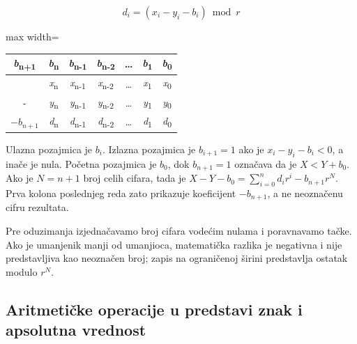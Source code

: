 \documentclass[a4paper,11pt]{article}
\numberwithin{equation}{section}
\newcommand{\redlinija}{\arrayrulecolor{black!28}\specialrule{0.3pt}{2pt}{2pt}\arrayrulecolor{black}}
\begin{document}
\begin{equation}\label{eq:1.2.1}
d_{i} = \left( x_i-y_i-b_i \right)\bmod r
\end{equation}


\begin{center}\begin{adjustbox}{max width=\linewidth}
\begin{tabular}{ccccccc}\toprule
\emph{b}\textsubscript{n+1} & \emph{b}\textsubscript{n} & \emph{b}\textsubscript{n-1} & \emph{b}\textsubscript{n-2} & \ldots{} & \emph{b}\textsubscript{1} & \emph{b}\textsubscript{0} \\
\midrule
 & \emph{x}\textsubscript{n} & \emph{x}\textsubscript{n-1} & \emph{x}\textsubscript{n-2} & \ldots{} & \emph{x}\textsubscript{1} & \emph{x}\textsubscript{0} \\
\redlinija
- & \emph{y}\textsubscript{n} & \emph{y}\textsubscript{n-1} & \emph{y}\textsubscript{n-2} & \ldots{} & \emph{y}\textsubscript{1} & \emph{y}\textsubscript{0} \\
\redlinija
$-b_{n+1}$ & \emph{d}\textsubscript{n} & \emph{d}\textsubscript{n-1} & \emph{d}\textsubscript{n-2} & \ldots{} & \emph{d}\textsubscript{1} & \emph{d}\textsubscript{0} \\
\bottomrule\end{tabular}\end{adjustbox}\end{center}


Ulazna pozajmica je $b_i$. Izlazna pozajmica je $b_{i+1}=1$ ako je $x_i-y_i-b_i<0$, a inače je nula. Početna pozajmica je $b_0$, dok $b_{n+1}=1$ označava da je $X<Y+b_0$. Ako je $N=n+1$ broj celih cifara, tada je $X-Y-b_0=\sum_{i=0}^{n}d_i r^i-b_{n+1}r^N$. Prva kolona poslednjeg reda zato prikazuje koeficijent $-b_{n+1}$, a ne neoznačenu cifru rezultata.

Pre oduzimanja izjednačavamo broj cifara vodećim nulama i poravnavamo tačke. Ako je umanjenik manji od umanjioca, matematička razlika je negativna i nije predstavljiva kao neoznačen broj; zapis na ograničenoj širini predstavlja ostatak modulo $r^N$.

\FloatBarrier
\subsection{Aritmetičke operacije u predstavi znak i apsolutna vrednost}\label{sec:1.2}
\end{document}
